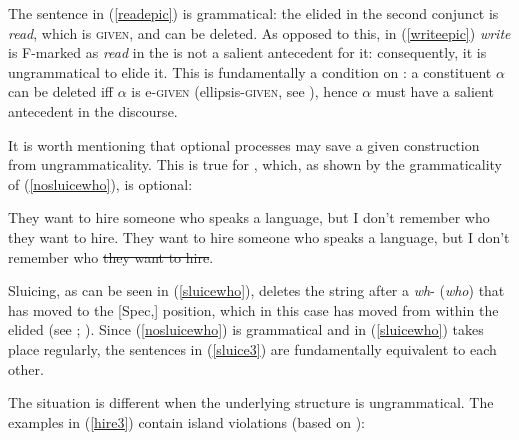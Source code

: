 \ea \label{ralphnovel3}
 \label{readepic}
 \label{writeepic}
\z
\z

The sentence in (\ref{readepic}) is grammatical: the elided  in the second conjunct is \textit{read}, which is \textsc{given}, and can be deleted. As opposed to this, in (\ref{writeepic}) \textit{write} is F-marked as \textit{read} in the  is not a salient antecedent for it: consequently, it is ungrammatical to elide it. This is fundamentally a  condition on : a constituent $\alpha$ can be deleted iff $\alpha$ is e-\textsc{given} (ellipsis-\textsc{given}, see \citealt[38]{merchant2001}), hence $\alpha$ must have a salient antecedent in the discourse.

It is worth mentioning that optional  processes may save a given construction from ungrammaticality. This is true for , which, as shown by the grammaticality of (\ref{nosluicewho}), is optional:

\ea \label{sluice3}
\ea	They want to hire someone who speaks a  language, but I don't remember who they want to hire. \label{nosluicewho}
\ex	They want to hire someone who speaks a  language, but I don't remember who \sout{they want to hire}. \label{sluicewho}
\z
\z

Sluicing, as can be seen in (\ref{sluicewho}), deletes the string after a \textit{wh}- (\textit{who}) that has moved to the [Spec,] position, which in this case has moved from within the elided  (see \citealt{merchant2001}; \citealt{vancraenenbroeckliptak2006}). Since (\ref{nosluicewho}) is grammatical and in (\ref{sluicewho})  takes place regularly, the sentences in (\ref{sluice3}) are fundamentally equivalent to each other.

The situation is different when the underlying structure is ungrammatical. The examples in (\ref{hire3}) contain island violations (based on \citealt[114, ex. 15]{merchant2001}):

\ea \label{hire3}
 \label{nosluicewhich}
 \label{sluicewhich}
\z
\z

